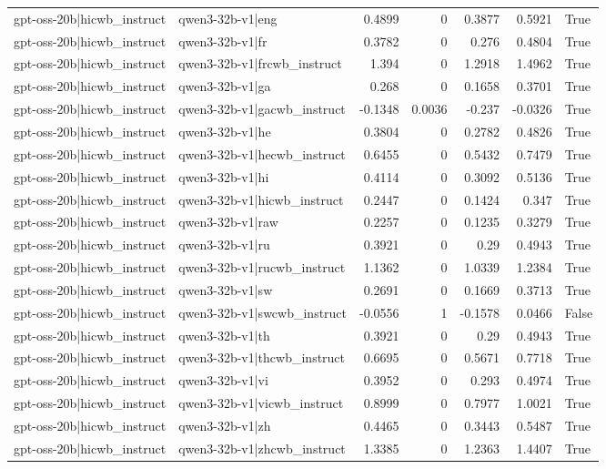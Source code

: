 \begin{table}
\begin{tabular}{l l r r r r l}
gpt-oss-20b|hicwb_instruct & qwen3-32b-v1|eng & 0.4899 & 0 & 0.3877 & 0.5921 & True \\
gpt-oss-20b|hicwb_instruct & qwen3-32b-v1|fr & 0.3782 & 0 & 0.276 & 0.4804 & True \\
gpt-oss-20b|hicwb_instruct & qwen3-32b-v1|frcwb_instruct & 1.394 & 0 & 1.2918 & 1.4962 & True \\
gpt-oss-20b|hicwb_instruct & qwen3-32b-v1|ga & 0.268 & 0 & 0.1658 & 0.3701 & True \\
gpt-oss-20b|hicwb_instruct & qwen3-32b-v1|gacwb_instruct & -0.1348 & 0.0036 & -0.237 & -0.0326 & True \\
gpt-oss-20b|hicwb_instruct & qwen3-32b-v1|he & 0.3804 & 0 & 0.2782 & 0.4826 & True \\
gpt-oss-20b|hicwb_instruct & qwen3-32b-v1|hecwb_instruct & 0.6455 & 0 & 0.5432 & 0.7479 & True \\
gpt-oss-20b|hicwb_instruct & qwen3-32b-v1|hi & 0.4114 & 0 & 0.3092 & 0.5136 & True \\
gpt-oss-20b|hicwb_instruct & qwen3-32b-v1|hicwb_instruct & 0.2447 & 0 & 0.1424 & 0.347 & True \\
gpt-oss-20b|hicwb_instruct & qwen3-32b-v1|raw & 0.2257 & 0 & 0.1235 & 0.3279 & True \\
gpt-oss-20b|hicwb_instruct & qwen3-32b-v1|ru & 0.3921 & 0 & 0.29 & 0.4943 & True \\
gpt-oss-20b|hicwb_instruct & qwen3-32b-v1|rucwb_instruct & 1.1362 & 0 & 1.0339 & 1.2384 & True \\
gpt-oss-20b|hicwb_instruct & qwen3-32b-v1|sw & 0.2691 & 0 & 0.1669 & 0.3713 & True \\
gpt-oss-20b|hicwb_instruct & qwen3-32b-v1|swcwb_instruct & -0.0556 & 1 & -0.1578 & 0.0466 & False \\
gpt-oss-20b|hicwb_instruct & qwen3-32b-v1|th & 0.3921 & 0 & 0.29 & 0.4943 & True \\
gpt-oss-20b|hicwb_instruct & qwen3-32b-v1|thcwb_instruct & 0.6695 & 0 & 0.5671 & 0.7718 & True \\
gpt-oss-20b|hicwb_instruct & qwen3-32b-v1|vi & 0.3952 & 0 & 0.293 & 0.4974 & True \\
gpt-oss-20b|hicwb_instruct & qwen3-32b-v1|vicwb_instruct & 0.8999 & 0 & 0.7977 & 1.0021 & True \\
gpt-oss-20b|hicwb_instruct & qwen3-32b-v1|zh & 0.4465 & 0 & 0.3443 & 0.5487 & True \\
gpt-oss-20b|hicwb_instruct & qwen3-32b-v1|zhcwb_instruct & 1.3385 & 0 & 1.2363 & 1.4407 & True \\

\end{tabular}
\end{table}
